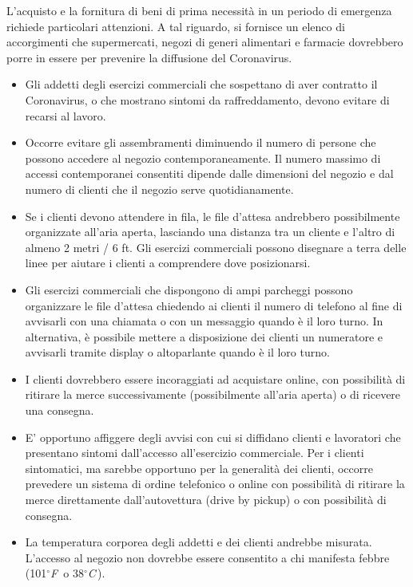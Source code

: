 \documentclass[onecolumn,journal]{IEEEtran}
\begin{document}
\begin{multicols}{2}

L'acquisto e la fornitura di beni di prima necessità in un periodo di emergenza richiede particolari attenzioni. A tal riguardo, si fornisce un elenco di accorgimenti che supermercati, negozi di generi alimentari e farmacie dovrebbero porre in essere per prevenire la diffusione del Coronavirus.


\begin{itemize}

  \item Gli addetti degli esercizi commerciali che sospettano di aver contratto il Coronavirus, o che mostrano sintomi da raffreddamento, devono evitare di recarsi al lavoro.
  \item Occorre evitare gli assembramenti diminuendo il numero di persone che possono accedere al negozio contemporaneamente. Il numero massimo di accessi contemporanei consentiti dipende dalle dimensioni del negozio e dal numero di clienti che il negozio serve quotidianamente.
  \item Se i clienti devono attendere in fila, le file d'attesa andrebbero possibilmente organizzate all'aria aperta, lasciando una distanza tra un cliente e l'altro di almeno 2 metri / 6 ft. Gli esercizi commerciali possono disegnare a terra delle linee per aiutare i clienti a comprendere dove posizionarsi.
  \item Gli esercizi commerciali che dispongono di ampi parcheggi possono organizzare le file d'attesa chiedendo ai clienti il numero di telefono al fine di avvisarli con una chiamata o con un messaggio quando è il loro turno. In alternativa, è possibile mettere a disposizione dei clienti un numeratore e avvisarli tramite display o altoparlante quando è il loro turno.
  \item I clienti dovrebbero essere incoraggiati ad acquistare online, con possibilità di ritirare la merce successivamente (possibilmente all'aria aperta) o di ricevere una consegna.
  \item E' opportuno affiggere degli avvisi con cui si diffidano clienti e lavoratori che presentano sintomi dall'accesso all'esercizio commerciale. Per i clienti sintomatici, ma sarebbe opportuno per la generalità dei clienti, occorre prevedere un sistema di ordine telefonico o online con possibilità di ritirare la merce direttamente dall'autovettura (drive by pickup) o con possibilità di consegna.
  \item La temperatura corporea degli addetti e dei clienti andrebbe misurata. L'accesso al negozio non dovrebbe essere consentito a chi manifesta febbre (101$^{\circ}$\textit F\, o 38$^{\circ}$\textit C\,).

\end{itemize}
\end{multicols}
\end{document}
